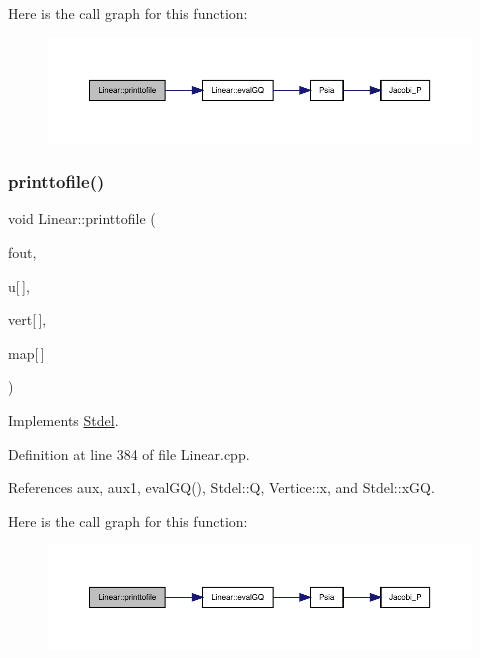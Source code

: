 Here is the call graph for this function\+:
\nopagebreak
\begin{figure}[H]
\begin{center}
\leavevmode
\includegraphics[width=350pt]{classLinear_a6d58a6496896386af09591187d08ab73_cgraph}
\end{center}
\end{figure}
\mbox{\label{classLinear_a8d3d30b9a1367f2cc154b79905554dd7}} 
\subsubsection{\texorpdfstring{printtofile()}{printtofile()}\hspace{0.1cm}{\footnotesize\ttfamily [2/2]}}
{\footnotesize\ttfamily void Linear\+::printtofile (\begin{DoxyParamCaption}\item[{F\+I\+LE $\ast$}]{fout,  }\item[{const double}]{u\mbox{[}$\,$\mbox{]},  }\item[{const \hyperlink{structVertice}{Vertice}}]{vert\mbox{[}$\,$\mbox{]},  }\item[{const int}]{map\mbox{[}$\,$\mbox{]} }\end{DoxyParamCaption})\hspace{0.3cm}{\ttfamily [virtual]}}



Implements \hyperlink{classStdel_a6863f8aeb8e4fb01299b109b0dd3fe13}{Stdel}.



Definition at line 384 of file Linear.\+cpp.



References aux, aux1, eval\+G\+Q(), Stdel\+::Q, Vertice\+::x, and Stdel\+::x\+GQ.

Here is the call graph for this function\+:
\nopagebreak
\begin{figure}[H]
\begin{center}
\leavevmode
\includegraphics[width=350pt]{classLinear_a8d3d30b9a1367f2cc154b79905554dd7_cgraph}
\end{center}
\end{figure}
\mbox{\label{classLinear_a9afe2e4dfee0c0b43021f0086c3d9d1d}} 
